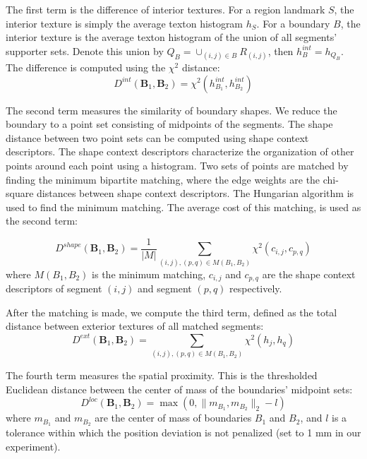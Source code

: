 \documentclass{llncs}
\begin{document}
The first term is the difference of interior textures. For a region landmark $S$, the interior texture is simply the average texton histogram $h_S$. For a boundary $B$, the interior texture is the average texton histogram of the union of all segments' supporter sets. Denote this union by $Q_B = \cup_{(i,j)\in B} R_{(i,j)}$, then $h^{int}_B = h_{Q_B}$. The difference is computed using the $\chi^2$ distance:
$$D^{int}(\mathbf{B}_1, \mathbf{B}_2) = \chi^2(h^{int}_{B_1}, h^{int}_{B_2})$$

The second term measures the similarity of boundary shapes. We reduce the boundary to a point set consisting of midpoints of the segments. The shape distance between two point sets can be computed using shape context descriptors\cite{belongie2000shape}. The shape context descriptors characterize the organization of other points around each point using a histogram. Two sets of points are matched by finding the minimum bipartite matching, where the edge weights are the chi-square distances between shape context descriptors. The Hungarian algorithm is used to find the minimum matching. The average cost of this matching, is used as the second term:

$$D^{shape}(\mathbf{B}_1, \mathbf{B}_2) = \frac{1}{|M|}\sum_{(i,j), (p,q) \in M(B_1,B_2)} \chi^2(c_{i,j}, c_{p,q})$$ where $M(B_1,B_2)$ is the minimum matching, $c_{i,j}$ and $c_{p,q}$ are the shape context descriptors of segment $(i,j)$ and segment $(p,q)$ respectively.

After the matching is made, we compute the third term, defined as the total distance between exterior textures of all matched segments:
$$D^{ext}(\mathbf{B}_1, \mathbf{B}_2) = \sum_{(i,j), (p,q) \in M(B_1,B_2)} \chi^2(h_j, h_q)$$


The fourth term measures the spatial proximity. This is the thresholded Euclidean distance between the center of mass of the boundaries' midpoint sets:
$$D^{loc}(\mathbf{B}_1, \mathbf{B}_2) = \max(0, \| m_{B_1}, m_{B_2} \|_2 - l)$$
where $m_{B_1}$ and $m_{B_2}$ are the center of mass of boundaries $B_1$ and $B_2$, and $l$ is a tolerance within which the position deviation is not penalized (set to 1 mm in our experiment).


\end{document}
